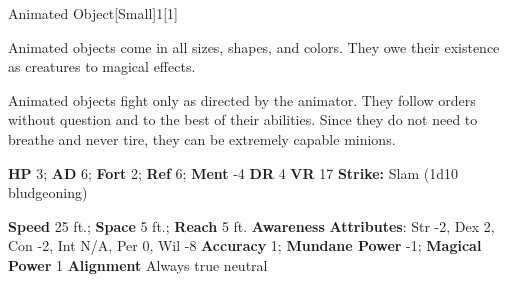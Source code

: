   
  \begin{monsection}{Animated Object}[Small]{1}[1]
    \vspace{-1em}\vspace{-1em}
    \vspace{0em}

    
    Animated objects come in all sizes, shapes, and colors. They owe their existence as creatures to magical effects.

    Animated objects fight only as directed by the animator. They follow orders without question and to the best of their abilities. Since they do not need to breathe and never tire, they can be extremely capable minions.
  
    

    \begin{spellcontent}
      \begin{spelltargetinginfo}
        \pari \textbf{HP} 3;
          \textbf{AD} 6;
          \textbf{Fort} 2;
          \textbf{Ref} 6;
          \textbf{Ment} -4
        \pari \textbf{DR} 4
        \pari \textbf{VR} 17
        \pari \textbf{Strike:}
            Slam  (1d10 bludgeoning)
      \end{spelltargetinginfo}
    \end{spellcontent}
    \begin{monsterfooter}
      \pari \textbf{Speed} 25 ft.;
        \textbf{Space} 5 ft.;
        \textbf{Reach} 5 ft.
      \pari \textbf{Awareness} 
      \pari \textbf{Attributes}:
        Str -2, Dex 2,
        Con -2, Int N/A,
        Per 0, Wil -8
      \pari \textbf{Accuracy} 1;
        \textbf{Mundane Power} -1;
      \textbf{Magical Power} 1
      \pari \textbf{Alignment} Always true neutral
    \end{monsterfooter}
  \end{monsection}
  

